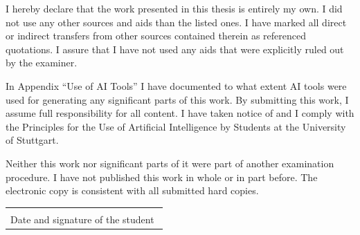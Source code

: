 \documentclass[
  numbers=noenddot,
  english,
  a4paper,
  twoside,
  bibliography=totoc,
  headsepline,
  cleardoublepage=empty,
  parskip=half,
  draft=false
]{scrbook}
\theoremstyle{break}
\renewcommand{\_}{\textunderscore\allowbreak}
\begin{document}
I hereby declare that the work presented in this thesis is entirely my own.
I did not use any other sources and aids than the listed ones.
I have marked all direct or indirect transfers from other sources contained therein as
referenced quotations.
I assure that I have not used any aids that were explicitly ruled out by the examiner.

In Appendix \enquote{Use of AI Tools} I have documented to what extent AI tools were used
for generating any significant parts of this work.
By submitting this work, I assume full responsibility for all content.
I have taken notice of and I comply with the Principles for the Use of Artificial Intelligence
by Students at the University of Stuttgart.

Neither this work nor significant parts of it were part of another examination procedure.
I have not published this work in whole or in part before.
The electronic copy is consistent with all submitted hard copies.

\vspace{3cm}

\noindent
\begin{tabular}{@{}p{0.45\linewidth}@{}}
  \hrulefill \\
  Date and signature of the student
\end{tabular}
\end{document}
